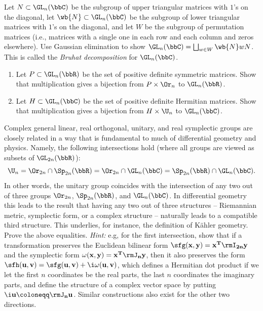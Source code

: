 \begin{xca}
    Let $N\subset \GL_n(\bbC)$ be the subgroup of upper triangular matrices with $1$'s on the diagonal, let $\wb{N}\subset \GL_n(\bbC)$ be the subgroup of lower triangular matrices with $1$'s on the diagonal, and let $W$ be the subgroup of permutation matrices (i.e., matrices with a single one in each row and each column and zeros elsewhere). Use Gaussian elimination to show $\GL_n(\bbC)=\bigsqcup_{w\in W}\wb{N}wN$. This is called the \emph{Bruhat decomposition} for $\GL_n(\bbC)$.
\end{xca}

\begin{xca}
    \begin{enumerate}[label=(\alph*)]
        \item Let $P\subset \GL_n(\bbR)$ be the set of positive definite symmetric matrices. Show that multiplication gives a bijection from $P\times \Or_n$ to $\GL_n(\bbR)$.
        \item Let $H\subset \GL_n(\bbC)$ be the set of positive definite Hermitian matrices. Show that multiplication gives a bijection from $H\times\U_n$ to $\GL_n(\bbC)$.
    \end{enumerate}
\end{xca}

\begin{xca}
    Complex general linear, real orthogonal, unitary, and real symplectic groups are closely related in a way that is fundamental to much of differential geometry and physics. Namely, the following intersections hold (where all groups are viewed as subsets of $\GL_{2n}(\bbR)$):
    \[\U_n=\Or_{2n}\cap \Sp_{2n}(\bbR)=\Or_{2n}\cap \GL_{n}(\bbC)=\Sp_{2n}(\bbR)\cap \GL_{n}(\bbC). \]
    In other words, the unitary group coincides with the intersection of any two out of three groups $\Or_{2n}$, $\Sp_{2n}(\bbR)$, and $\GL_{n}(\bbC)$. In differential geometry this leads to the result that having any two out of three structures -- Riemannian metric, symplectic form, or a complex structure -- naturally leads to a compatible third structure. This underlies, for instance, the definition of K\"ahler geometry. Prove the above equalities. \emph{Hint:} e.g, for the first intersection, show that if a transformation preserves the Euclidean bilinear form $\sfg(\bf x,\bf y)=\bf x^T\rmI_{2n}\bf y$ and the symplectic form $\omega(\bf x,\bf y)=\bf x^T\rmJ_n \bf y$, then it also preserves the form $\sfh(\bf u,\bf v)=\sfg(\bf u,\bf v)+\i\omega(\bf u,\bf v)$, which defines a Hermitian dot product if we let the first $n$ coordinates be the real parts, the last $n$ coordinates the imaginary parts, and define the structure of a complex vector space by putting $\i\bf u\coloneqq \rmJ_n \bf u$. Similar constructions also exist for the other two directions.
\end{xca}







